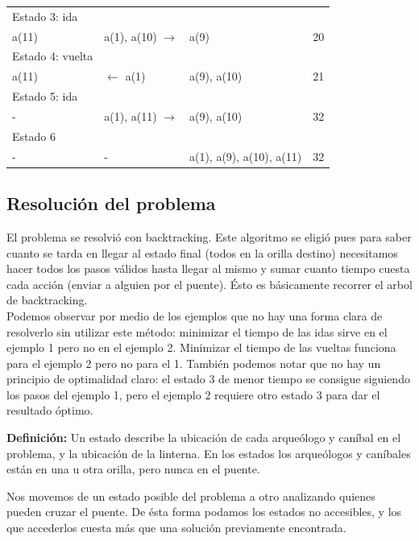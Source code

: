 \begin{center}
\begin{tabular}{| l | l | l || l |}
    \hline  
    Estado 3: ida & & & \\
    a(11) & a(1), a(10) $\rightarrow$ & a(9) & 20\\
    \hline  
    Estado 4: vuelta & & & \\
    a(11) & $\leftarrow$ a(1) & a(9), a(10) & 21\\
    \hline  
    Estado 5: ida & & & \\
     - & a(1), a(11) $\rightarrow$ & a(9), a(10) & 32\\
    \hline  
    Estado 6 & & & \\
    - & - & a(1), a(9), a(10), a(11) & 32\\
    \hline
\end{tabular}
\end{center}

\newpage
\subsection{Resolución del problema}
El problema se resolvió con backtracking. 
Este algoritmo se eligió pues para saber cuanto se tarda en llegar al estado final (todos en la orilla destino) necesitamos hacer todos los pasos válidos hasta llegar al mismo y sumar cuanto tiempo cuesta cada acción (enviar a alguien por el puente). \'Esto es b\'asicamente recorrer el arbol de backtracking.
\\

Podemos observar por medio de los ejemplos que no hay una forma clara de resolverlo sin utilizar este método: minimizar el tiempo de las idas sirve en el ejemplo 1 pero no en el ejemplo 2. 
Minimizar el tiempo de las vueltas funciona para el ejemplo 2 pero no para el 1. 
También podemos notar que no hay un principio de optimalidad claro: el estado 3 de menor tiempo se consigue siguiendo los pasos del ejemplo 1, pero el ejemplo 2 requiere otro estado 3 para dar el resultado óptimo.

\vspace*{5mm}
\textbf{Definición:} Un estado describe la ubicación de cada arqueólogo y caníbal en el problema, y la ubicación de la linterna. En los estados los arqueólogos y caníbales están en una u otra orilla, pero nunca en el puente.

\vspace*{5mm}
Nos movemos de un estado posible del problema a otro analizando quienes pueden cruzar el puente. De ésta forma podamos los estados no accesibles, y los que accederlos cuesta más que una solución previamente encontrada.

